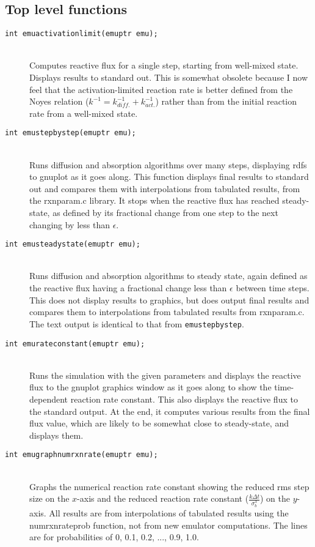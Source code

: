 \documentclass {book}
\newcommand {\ttt} {\texttt}
\begin{document}
\subsection{Top level functions}

\begin{description}

\item[\ttt{int emuactivationlimit(emuptr emu);}]
\hfill \\
Computes reactive flux for a single step, starting from well-mixed state. Displays results to standard out. This is somewhat obsolete because I now feel that the activation-limited reaction rate is better defined from the Noyes relation ($k^{-1} = k_{diff.}^{-1}+k_{act.}^{-1}$) rather than from the initial reaction rate from a well-mixed state.

\item[\ttt{int emustepbystep(emuptr emu);}]
\hfill \\
Runs diffusion and absorption algorithms over many steps, displaying rdfs to gnuplot as it goes along. This function displays final results to standard out and compares them with interpolations from tabulated results, from the rxnparam.c library. It stops when the reactive flux has reached steady-state, as defined by its fractional change from one step to the next changing by less than $\epsilon$.

\item[\ttt{int emusteadystate(emuptr emu);}]
\hfill \\
Runs diffusion and absorption algorithms to steady state, again defined as the reactive flux having a fractional change less than $\epsilon$ between time steps. This does not display results to graphics, but does output final results and compares them to interpolations from tabulated results from rxnparam.c. The text output is identical to that from \ttt{emustepbystep}.

\item[\ttt{int emurateconstant(emuptr emu);}]
\hfill \\
Runs the simulation with the given parameters and displays the reactive flux to the gnuplot graphics window as it goes along to show the time-dependent reaction rate constant. This also displays the reactive flux to the standard output. At the end, it computes various results from the final flux value, which are likely to be somewhat close to steady-state, and displays them.

\item[\ttt{int emugraphnumrxnrate(emuptr emu);}]
\hfill \\
Graphs the numerical reaction rate constant showing the reduced rms step size on the $x$-axis and the reduced reaction rate constant ($\frac{k \Delta t}{\sigma_b^3}$) on the $y$-axis. All results are from interpolations of tabulated results using the numrxnrateprob function, not from new emulator computations. The lines are for probabilities of 0, 0.1, 0.2, ..., 0.9, 1.0.

\end{description}
\end{document}
